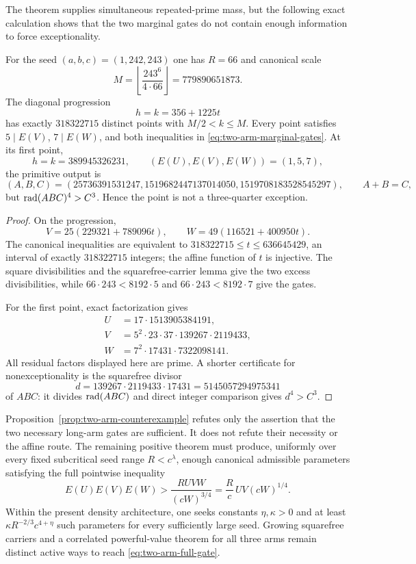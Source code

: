The theorem supplies simultaneous repeated-prime mass, but the following
exact calculation shows that the two marginal gates do not contain enough
information to force exceptionality.

\begin{proposition}
\label{prop:two-arm-counterexample}
For the seed $(a,b,c)=(1,242,243)$ one has $R=66$ and canonical scale
\[
 M=\left\lfloor\frac{243^6}{4\cdot66}\right\rfloor=779890651873.
\]
The diagonal progression
\[
                   h=k=356+1225t
\]
has exactly $318322715$ distinct points with $M/2<k\le M$.  Every point
satisfies $5\mid E(V)$, $7\mid E(W)$, and both inequalities in
\eqref{eq:two-arm-marginal-gates}.  At its first point,
\[
 h=k=389945326231,\qquad (E(U),E(V),E(W))=(1,5,7),
\]
the primitive output is
\[
 (A,B,C)=(25736391531247,
 1519682447137014050,1519708183528545297),\qquad A+B=C,
\]
but $\operatorname{rad}(ABC)^4>C^3$.  Hence the point is not a three-quarter exception.
\end{proposition}

\begin{proof}
On the progression,
\[
 V=25(229321+789096t),\qquad
 W=49(116521+400950t).
\]
The canonical inequalities are equivalent to
$318322715\le t\le636645429$, an interval of exactly $318322715$ integers;
the affine function of $t$ is injective.  The square divisibilities and the
squarefree-carrier lemma give the two excess divisibilities, while
$66\cdot243<8192\cdot5$ and $66\cdot243<8192\cdot7$ give the gates.

For the first point, exact factorization gives
\[
\begin{aligned}
 U&=17\cdot1513905384191,\\
 V&=5^2\cdot23\cdot37\cdot139267\cdot2119433,\\
 W&=7^2\cdot17431\cdot7322098141.
\end{aligned}
\]
All residual factors displayed here are prime.  A shorter certificate for
nonexceptionality is the squarefree divisor
\[
 d=139267\cdot2119433\cdot17431=5145057294975341
\]
of $ABC$: it divides $\operatorname{rad}(ABC)$ and direct integer comparison gives
$d^4>C^3$.
\end{proof}

Proposition~\ref{prop:two-arm-counterexample} refutes only the assertion that
the two necessary long-arm gates are sufficient.  It does not refute their
necessity or the affine route.  The remaining positive theorem must produce,
uniformly over every fixed subcritical seed range $R<c^\lambda$, enough
canonical admissible parameters satisfying the full pointwise inequality
\begin{equation}\label{eq:two-arm-full-gate}
 E(U)E(V)E(W)>
 \frac{RUVW}{(cW)^{3/4}}
 =\frac Rc\,UV(cW)^{1/4}.
\end{equation}
Within the present density architecture, one seeks constants
$\eta,\kappa>0$ and at least
$\kappa R^{-2/3}c^{4+\eta}$ such parameters for every sufficiently large
seed.  Growing squarefree carriers and a correlated powerful-value theorem
for all three arms remain distinct active ways to reach
\eqref{eq:two-arm-full-gate}.
